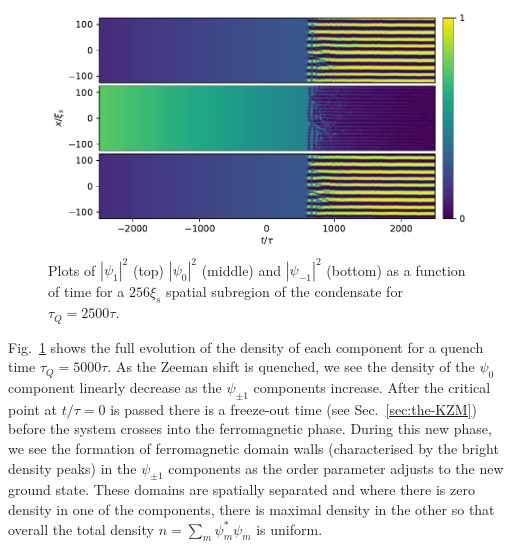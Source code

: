 \begin{figure}[tb]
    \centering
    \includegraphics[width=\textwidth]{gfx/ch-spin1/BA-FM_all_densities.pdf}
    \caption{Plots of $|\psi_1|^2$ (top) $|\psi_0|^2$ (middle) and
    $|\psi_{-1}|^2$ (bottom) as a function of time for a $256\xi_s$
    spatial subregion of the condensate for $\tau_Q=2500\tau$.}
    \label{fig: BA-FM-densities}
\end{figure}
Fig.~\ref{fig: BA-FM-densities} shows the full evolution of the density of each
component for a quench time $\tau_Q=5000\tau$.
As the Zeeman shift is quenched, we see the density of the $\psi_0$ component
linearly decrease as the $\psi_{\pm 1}$ components increase.
After the critical point at $t/\tau=0$ is passed there is a freeze-out time
(see Sec.~\ref{sec:the-KZM}) before the system crosses into the ferromagnetic
phase.
During this new phase, we see the formation of ferromagnetic domain walls
(characterised by the bright density peaks) in the $\psi_{\pm 1}$ components as
the order parameter adjusts to the new ground state.
These domains are spatially separated and where there is zero density in one of
the components, there is maximal density in the other so that overall the total
density $n=\sum_m\psi_m^*\psi_m$ is uniform.

